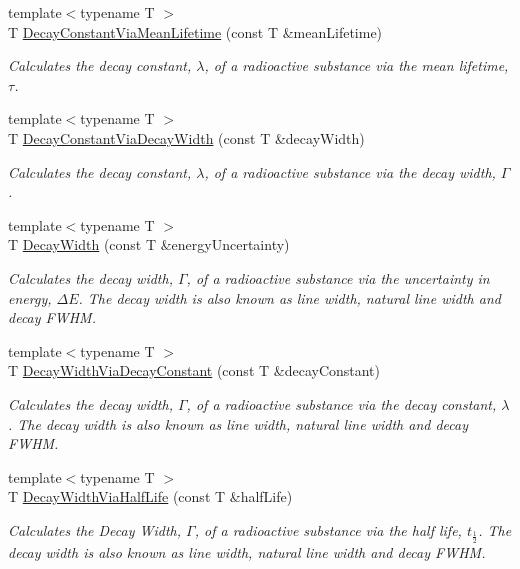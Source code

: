 \begin{DoxyCompactItemize}
{\footnotesize template$<$typename T $>$ }\\T \hyperlink{group___atomic_ga260cf6dc4f926269ea8966c19dfd269f}{Decay\+Constant\+Via\+Mean\+Lifetime} (const T \&mean\+Lifetime)
\begin{DoxyCompactList}\small\item\em Calculates the decay constant, $\lambda$, of a radioactive substance via the mean lifetime, $\tau$. \end{DoxyCompactList}\item 
{\footnotesize template$<$typename T $>$ }\\T \hyperlink{group___atomic_gac0dc5d8a75657eaa2e939dd243fe4ba8}{Decay\+Constant\+Via\+Decay\+Width} (const T \&decay\+Width)
\begin{DoxyCompactList}\small\item\em Calculates the decay constant, $\lambda$, of a radioactive substance via the decay width, $\Gamma$. \end{DoxyCompactList}\item 
{\footnotesize template$<$typename T $>$ }\\T \hyperlink{group___decay_width_gae232ec8bb39710131be898c057a25620}{Decay\+Width} (const T \&energy\+Uncertainty)
\begin{DoxyCompactList}\small\item\em Calculates the decay width, $\Gamma$, of a radioactive substance via the uncertainty in energy, $\Delta E$. The decay width is also known as line width, natural line width and decay F\+W\+HM. \end{DoxyCompactList}\item 
{\footnotesize template$<$typename T $>$ }\\T \hyperlink{group___decay_width_ga143a666966efecc535a59bb4f36a79c6}{Decay\+Width\+Via\+Decay\+Constant} (const T \&decay\+Constant)
\begin{DoxyCompactList}\small\item\em Calculates the decay width, $\Gamma$, of a radioactive substance via the decay constant, $\lambda$. The decay width is also known as line width, natural line width and decay F\+W\+HM. \end{DoxyCompactList}\item 
{\footnotesize template$<$typename T $>$ }\\T \hyperlink{group___decay_width_ga1113224b24790a2e34032f9e90ad55c6}{Decay\+Width\+Via\+Half\+Life} (const T \&half\+Life)
\begin{DoxyCompactList}\small\item\em Calculates the Decay Width, $\Gamma$, of a radioactive substance via the half life, $t_{\frac{1}{2}}$. The decay width is also known as line width, natural line width and decay F\+W\+HM. \end{DoxyCompactList}\item 

\end{DoxyCompactItemize}
